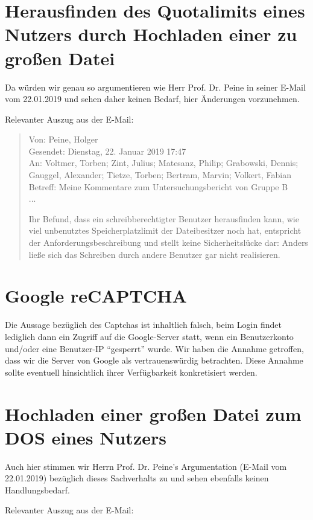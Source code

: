 \documentclass[12pt,DIV14,BCOR10mm,a4paper,parskip=half-,headsepline,headinclude,english,ngerman,bibliography=totocnumbered]{scrreprt}
\begin{document}
\section{Herausfinden des Quotalimits eines Nutzers durch Hochladen einer zu großen Datei}

Da würden wir genau so argumentieren wie Herr Prof. Dr. Peine in seiner E-Mail vom 22.01.2019 und sehen daher keinen Bedarf, hier Änderungen vorzunehmen.

Relevanter Auszug aus der E-Mail:

\blockquote{
Von: Peine, Holger \\
Gesendet: Dienstag, 22. Januar 2019 17:47 \\
An: Voltmer, Torben; Zint, Julius; Matesanz, Philip; Grabowski, Dennis; Gauggel, Alexander; Tietze, Torben; Bertram, Marvin; Volkert, Fabian  \\
Betreff: Meine Kommentare zum Untersuchungsbericht von Gruppe B \\

...

Ihr Befund, dass ein schreibberechtigter Benutzer herausfinden kann, wie viel
unbenutztes Speicherplatzlimit der Dateibesitzer noch hat, entspricht der
Anforderungsbeschreibung und stellt keine Sicherheitslücke dar: Anders ließe
sich das Schreiben durch andere Benutzer gar nicht realisieren.
}

\section{Google reCAPTCHA}

Die Aussage bezüglich des Captchas ist inhaltlich falsch, beim Login findet lediglich dann ein Zugriff auf die Google-Server statt, wenn ein Benutzerkonto und/oder eine Benutzer-IP \enquote{gesperrt} wurde.
Wir haben die Annahme getroffen, dass wir die Server von Google als vertrauenswürdig betrachten.
Diese Annahme sollte eventuell hinsichtlich ihrer Verfügbarkeit konkretisiert werden.

\section{Hochladen einer großen Datei zum DOS eines Nutzers}

Auch hier stimmen wir Herrn Prof. Dr. Peine's Argumentation (E-Mail vom 22.01.2019) bezüglich dieses Sachverhalts zu und sehen ebenfalls keinen Handlungsbedarf.

Relevanter Auszug aus der E-Mail:
\end{document}
